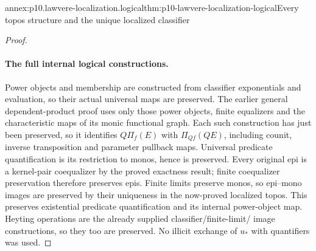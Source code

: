 \begin{annexitem}{annex:p10.lawvere-localization.logical}{thm:p10-lawvere-localization-logical}{Every topos structure and the unique localized classifier}
\begin{proof}
\paragraph{The full internal logical constructions.}
Power objects and membership are constructed
from classifier exponentials and evaluation,
so their actual universal maps are preserved.
The earlier general dependent-product proof
uses only those power objects, finite equalizers
and the characteristic maps of its monic
functional graph.  Each such construction
has just been preserved, so it identifies
\(Q\Pi_f(E)\) with \(\Pi_{Qf}(QE)\),
including counit, inverse transposition and
parameter pullback maps.
Universal predicate quantification is its
restriction to monos, hence is preserved.
Every original epi is a kernel-pair
coequalizer by the proved exactness result;
finite coequalizer preservation therefore
preserves epis.  Finite limits preserve
monos, so epi--mono images are preserved
by their uniqueness in the now-proved
localized topos.  This preserves existential
predicate quantification and its internal
power-object map.  Heyting operations are
the already supplied classifier/finite-limit/
image constructions, so they too are
preserved.  No illicit exchange of
\(u_*\) with quantifiers was used.
\end{proof}
\end{annexitem}

